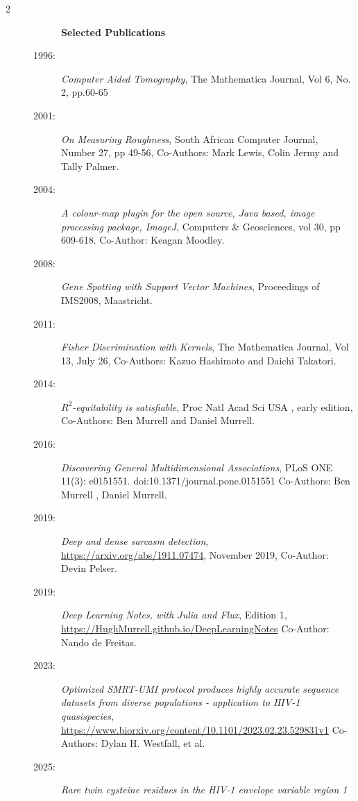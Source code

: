 \documentclass[12pt]{article}
\begin{document}
\newpage
\begin{multicols}{2}

\begin{description}\item[] \begin{description}\item[] {\large \bf  Selected Publications  }
\item[1996:]
      {\it Computer Aided Tomography},
      The Mathematica Journal, Vol 6, No. 2, pp.60-65 
\item[2001:]
      {\it On Measuring Roughness}, South African Computer Journal,
      Number 27, pp 49-56, Co-Authors:
      Mark Lewis, Colin Jermy and Tally Palmer.
 \item[2004:]
      {\it A colour-map plugin for the open source, Java based,
      image processing package, ImageJ},
      Computers \& Geosciences, vol 30, pp 609-618.
      Co-Author: Keagan Moodley. 
\item[2008:]
      {\it Gene Spotting with Support Vector Machines},
      Proceedings of IMS2008,
      Maastricht. 
\item[2011:]
      {\it Fisher Discrimination with Kernels},
      The Mathematica Journal, Vol 13, July 26,
      Co-Authors: Kazuo Hashimoto and Daichi Takatori. 
\item[2014:]
         {\it $R^2$-equitability is satisfiable}, Proc Natl Acad Sci USA , early edition, 
         Co-Authors: Ben Murrell and Daniel Murrell. 
\item[2016:]
         {\it Discovering General Multidimensional Associations},
         PLoS ONE 11(3): e0151551. doi:10.1371/journal.pone.0151551
	Co-Authors: Ben Murrell , Daniel Murrell. 
\item[2019:]
         {\it Deep and dense sarcasm detection},
         \url{https://arxiv.org/abs/1911.07474}, November 2019,
         Co-Author: Devin Pelser. 
 \item[2019:]
 	{\it Deep Learning Notes, with Julia and Flux}, Edition 1,
	\url{https://HughMurrell.github.io/DeepLearningNotes}
	Co-Author: Nando de Freitas. 
\item[2023:]
         {\it Optimized SMRT-UMI protocol produces highly accurate 
         sequence datasets from diverse populations - application to HIV-1 quasispecies},
         \url{https://www.biorxiv.org/content/10.1101/2023.02.23.529831v1}
         Co-Authors: Dylan H. Westfall, et al.
 \item[2025:]
         {\it Rare twin cysteine residues in the HIV-1 envelope variable region 1 
}
\end{description}
\end{description}
\end{multicols}
\end{document}
